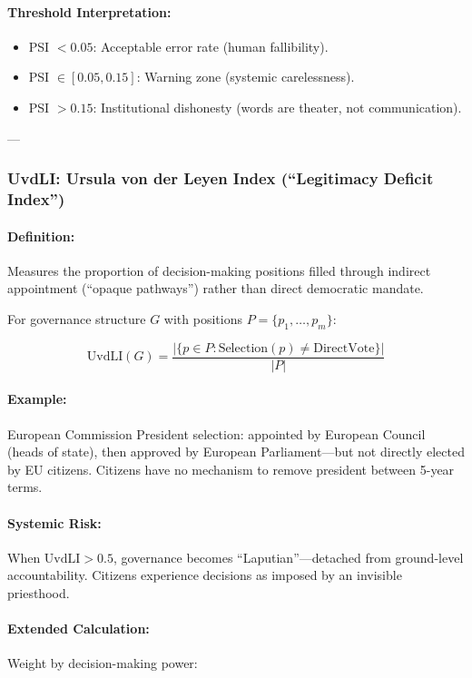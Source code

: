 \documentclass[11pt,a4paper]{article}
\theoremstyle{definition}
\theoremstyle{remark}
\begin{document}
\paragraph{Threshold Interpretation:}
\begin{itemize}
\item PSI $< 0.05$: Acceptable error rate (human fallibility).
\item PSI $\in [0.05, 0.15]$: Warning zone (systemic carelessness).
\item PSI $> 0.15$: Institutional dishonesty (words are theater, not communication).
\end{itemize}

---

\subsubsection{UvdLI: Ursula von der Leyen Index (``Legitimacy Deficit Index'')}

\paragraph{Definition:}
Measures the proportion of decision-making positions filled through indirect appointment (``opaque pathways'') rather than direct democratic mandate.

For governance structure $G$ with positions $P = \{p_1, \dots, p_m\}$:

\[
\text{UvdLI}(G) = \frac{|\{p \in P : \text{Selection}(p) \neq \text{DirectVote}\}|}{|P|}
\]

\paragraph{Example:}
European Commission President selection: appointed by European Council (heads of state), then approved by European Parliament—but not directly elected by EU citizens. Citizens have no mechanism to remove president between 5-year terms.

\paragraph{Systemic Risk:}
When $\text{UvdLI} > 0.5$, governance becomes ``Laputian''—detached from ground-level accountability. Citizens experience decisions as imposed by an invisible priesthood.

\paragraph{Extended Calculation:}
Weight by decision-making power:
\end{document}
